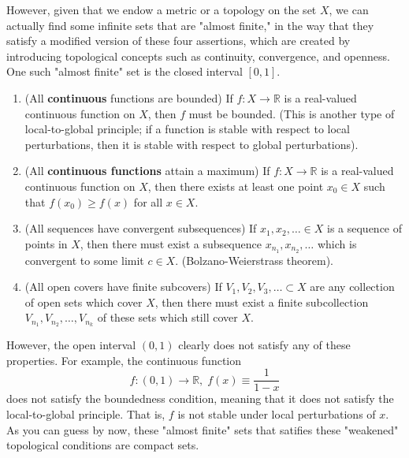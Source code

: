     However, given that we endow a metric or a topology on the set $X$, we can actually find some infinite sets that are "almost finite," in the way that they satisfy a modified version of these four assertions, which are created by introducing topological concepts such as continuity, convergence, and openness. One such "almost finite" set is the closed interval $[0,1]$. 
    \begin{enumerate}
      \item (All \textbf{continuous} functions are bounded) If $f: X \rightarrow \mathbb{R}$ is a real-valued continuous function on $X$, then $f$ must be bounded. (This is another type of local-to-global principle; if a function is stable with respect to local perturbations, then it is stable with respect to global perturbations).

      \item (All \textbf{continuous functions} attain a maximum) If $f: X \rightarrow \mathbb{R}$ is a real-valued continuous function on $X$, then there exists at least one point $x_0 \in X$ such that $f(x_0) \geq f(x)$ for all $x \in X$. 

      \item (All sequences have convergent subsequences) If $x_1, x_2, \ldots  \in X$ is a sequence of points in $X$, then there must exist a subsequence $x_{n_1}, x_{n_2}, \ldots $ which is convergent to some limit $c \in X$. (Bolzano-Weierstrass theorem).

      \item (All open covers have finite subcovers) If $V_1, V_2, V_3, \ldots  \subset X$ are any collection of open sets which cover $X$, then there must exist a finite subcollection $V_{n_1}, V_{n_2}, \ldots , V_{n_k}$ of these sets which still cover $X$. 
    \end{enumerate}

    However, the open interval $(0,1)$ clearly does not satisfy any of these properties. For example, the continuous function 
    \begin{equation}
      f: (0,1) \rightarrow \mathbb{R}, \; f(x) \equiv \frac{1}{1-x}
    \end{equation}
    does not satisfy the boundedness condition, meaning that it does not satisfy the local-to-global principle. That is, $f$ is not stable under local perturbations of $x$. As you can guess by now, these "almost finite" sets that satifies these "weakened" topological conditions are compact sets. 

    \begin{figure}[H]
      \centering 
      \caption{} 
      \label{fig:compact}
    \end{figure}

